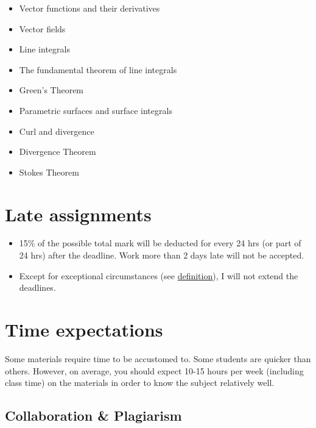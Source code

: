 \documentclass[
]{book}
\providecommand{\tightlist}{%
  \setlength{\itemsep}{0pt}\setlength{\parskip}{0pt}}
\theoremstyle{definition}
\theoremstyle{definition}
\theoremstyle{definition}
\theoremstyle{definition}
\theoremstyle{remark}
\begin{document}
\begin{itemize}
\tightlist
\item
  Vector functions and their derivatives
\item
  Vector fields
\item
  Line integrals
\item
  The fundamental theorem of line integrals
\item
  Green's Theorem
\item
  Parametric surfaces and surface integrals
\item
  Curl and divergence
\item
  Divergence Theorem
\item
  Stokes Theorem
\end{itemize}

\hypertarget{late-assignments}{%
\section*{Late assignments}\label{late-assignments}}

\begin{itemize}
\tightlist
\item
  15\% of the possible total mark will be deducted for every 24 hrs (or part of 24 hrs) after the
  deadline. Work more than 2 days late will not be accepted.
\item
  Except for exceptional circumstances (see \href{https://onestop.fulbright.edu.vn/s/article/Exceptional-Circumstance}{definition}),
  I will not extend the deadlines.
\end{itemize}

\hypertarget{time-expectations}{%
\section*{Time expectations}\label{time-expectations}}

Some materials require time to be accustomed to. Some students are quicker than
others. However, on average, you should expect 10-15 hours per week (including class time)
on the materials in order to know the subject relatively well.

\hypertarget{collaboration-plagiarism}{%
\subsection*{Collaboration \& Plagiarism}\label{collaboration-plagiarism}}
\end{document}

